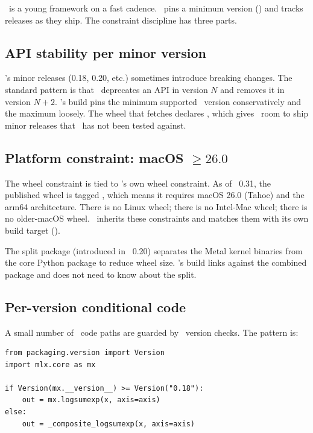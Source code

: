 \MLX\ is a young framework on a fast cadence. \Lucid\ pins a minimum
version () and tracks releases as they ship. The
constraint discipline has three parts.

\subsection{API stability per minor version}
\label{ssec:mlx_runtime:api_stability}

\MLX's minor releases (0.18, 0.20, etc.) sometimes introduce
breaking changes. The standard pattern is that \MLX\ deprecates an
API in version \(N\) and removes it in version \(N+2\). \Lucid's
build pins the minimum supported \MLX\ version conservatively and
the maximum loosely. The wheel that  fetches
declares , which gives \MLX\ room to ship
minor releases that \Lucid\ has not been tested against.

\subsection{Platform constraint: macOS \(\geq 26.0\)}
\label{ssec:mlx_runtime:macos_constraint}

The wheel constraint is tied to \MLX's own wheel constraint. As of
\MLX\ 0.31, the published wheel is tagged ,
which means it requires macOS 26.0 (Tahoe) and the arm64 architecture.
There is no Linux wheel; there is no Intel-Mac wheel; there is no
older-macOS wheel. \Lucid\ inherits these constraints and matches
them with its own build target ().

The  split package (introduced in \MLX\ 0.20)
separates the Metal kernel binaries from the core Python package
to reduce wheel size. \Lucid's build links against the combined
package and does not need to know about the split.

\subsection{Per-version conditional code}
\label{ssec:mlx_runtime:per_version}

A small number of \Lucid\ code paths are guarded by \MLX\ version
checks. The pattern is:

\begin{lstlisting}[style=lucid,language=LucidPython]
from packaging.version import Version
import mlx.core as mx

if Version(mx.__version__) >= Version("0.18"):
    out = mx.logsumexp(x, axis=axis)
else:
    out = _composite_logsumexp(x, axis=axis)
\end{lstlisting}

